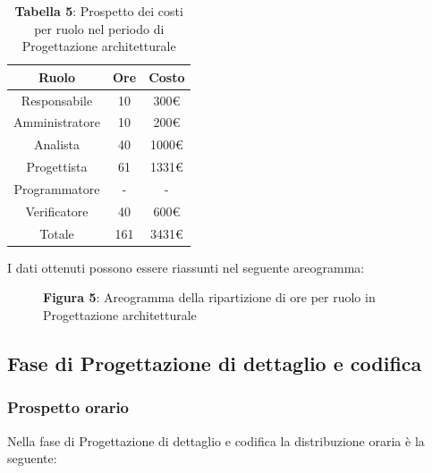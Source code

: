\begin{table}[H]
	\centering
	\renewcommand{\arraystretch}{1.5}
	\begin{tabular}{|c|c|c|}
		\hline
		\rowcolor{lighter-grayer}
		Ruolo & Ore & Costo \\
		\hline
		Responsabile & 10 & 300\euro \\%
		\hline
		Amministratore & 10 & 200\euro \\%
		\hline
		Analista & 40 & 1000\euro \\%
		\hline
		Progettista & 61 & 1331\euro \\%
		\hline
		Programmatore & - & - \\%
		\hline
		Verificatore & 40 & 600\euro \\%
		\hline
		Totale & 161 &  3431\euro \\
		\hline
	\end{tabular}
	\caption*{\textbf{Tabella 5}: Prospetto dei costi per ruolo nel periodo di Progettazione architetturale\\}
\end{table}

I dati ottenuti possono essere riassunti nel seguente areogramma:


\begin{figure}[H]
	\centering
	\caption*{\textbf{Figura 5}: Areogramma della ripartizione di ore per ruolo in Progettazione architetturale}
	\label{fig:Figura10}
\end{figure}



\subsection{Fase di Progettazione di dettaglio e codifica}
\subsubsection{Prospetto orario}
Nella fase di Progettazione di dettaglio e codifica la distribuzione oraria è la seguente:


